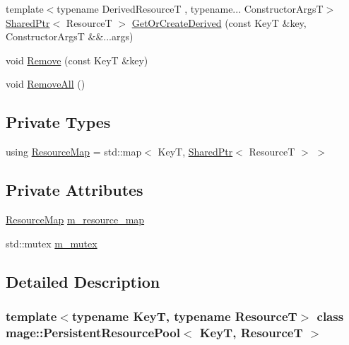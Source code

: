 \begin{DoxyCompactItemize}
\item 
{\footnotesize template$<$typename Derived\+ResourceT , typename... Constructor\+ArgsT$>$ }\\\hyperlink{namespacemage_a1e01ae66713838a7a67d30e44c67703e}{Shared\+Ptr}$<$ ResourceT $>$ \hyperlink{classmage_1_1_persistent_resource_pool_ab032807537c249df163193d8faf3bfd0}{Get\+Or\+Create\+Derived} (const KeyT \&key, Constructor\+ArgsT \&\&...args)
\item 
void \hyperlink{classmage_1_1_persistent_resource_pool_ae340b1445a0c362155926ab1d0e752b0}{Remove} (const KeyT \&key)
\item 
void \hyperlink{classmage_1_1_persistent_resource_pool_a58fc2530fae1a1814b58d86ca6fbcb5f}{Remove\+All} ()
\end{DoxyCompactItemize}
\subsection*{Private Types}
\begin{DoxyCompactItemize}
\item 
using \hyperlink{classmage_1_1_persistent_resource_pool_a9215c5816fc45ab5f772625df2a8a60c}{Resource\+Map} = std\+::map$<$ KeyT, \hyperlink{namespacemage_a1e01ae66713838a7a67d30e44c67703e}{Shared\+Ptr}$<$ ResourceT $>$ $>$
\end{DoxyCompactItemize}
\subsection*{Private Attributes}
\begin{DoxyCompactItemize}
\item 
\hyperlink{classmage_1_1_persistent_resource_pool_a9215c5816fc45ab5f772625df2a8a60c}{Resource\+Map} \hyperlink{classmage_1_1_persistent_resource_pool_a9fec1e7492b5aea2a006b4e150289795}{m\+\_\+resource\+\_\+map}
\item 
std\+::mutex \hyperlink{classmage_1_1_persistent_resource_pool_ac62c20842345306be0cddda2cb0d0524}{m\+\_\+mutex}
\end{DoxyCompactItemize}


\subsection{Detailed Description}
\subsubsection*{template$<$typename KeyT, typename ResourceT$>$\newline
class mage\+::\+Persistent\+Resource\+Pool$<$ Key\+T, Resource\+T $>$}

